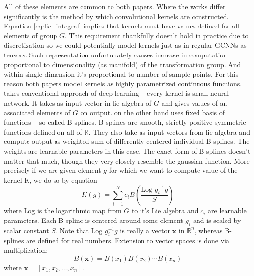     All of these elements are common to both papers. Where the works
    differ significantly is
    the method by which convolutional kernels are constructed. Equation
    \ref{eq:lie_integral} implies that kernels must have values defined for all
    elements of group $G$. This requirement thankfully doesn't hold in practice
    due to discretization so we could potentially model kernels just as in
    regular GCNNs as tensors. Such representation unfortunately causes increase
    in computation proportional to dimensionality (as manifold) of the
    transformation group. And within single dimension it's proportional to
    number of sample points. For this reason both papers model kernels as highly
    parametrized continuous functions. \cite{lieconv} takes conventional
    approach of deep learning -- every kernel is small neural network. It takes
    as input vector in lie algebra of $G$ and gives values of an associated
    elements of $G$ on output. \cite{bekkers2019} on the other hand uses fixed
    basis of functions -- so called B-splines. B-splines are smooth, strictly positive
    symmetric functions defined on all of $\mathbb{R}$. They also take as input
    vectors from lie algebra and compute output as weighted sum of differently
    centered individual B-splines. The weights are learnable parameters in this
    case. The exact form of B-splines doesn't matter that much, though they very
    closely resemble the gaussian function. More precisely if we are given
    element $g$ for which we want to compute value of the kernel K, we do so by
    equation
    \begin{equation}
        K(g) = \sum_{i=1}^N
        c_i
    B\left(\frac{\text{Log } g_i^{-1}g}{S}\right)
    \end{equation}
    where Log is the logarithmic map from $G$ to it's Lie algebra and $c_i$ are
    learnable parameters. Each B-spline is
    centered around some element $g_i$ and is scaled by scalar constant $S$. Note that
    $\text{Log } g_i^{-1}g$ is really a vector $\mathbf{x}$ in $\mathbb{R}^n$,
    whereas B-splines are defined for real numbers. Extension to vector spaces
    is done via multiplication:
    \begin{equation}
        B(\mathbf{x}) = B(x_1)B(x_2)\cdots B(x_n)
    \end{equation}
    where $\mathbf{x} = \left[x_1,x_2,\dots,x_n\right]$.












